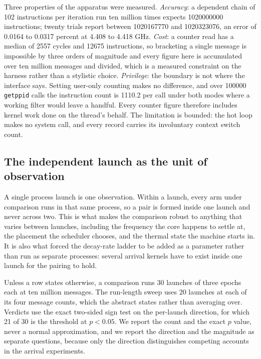 \documentclass[conference]{IEEEtran}
\begin{document}
Three properties of the apparatus were measured. \emph{Accuracy}: a dependent
chain of 102 instructions per iteration run ten million times expects
1020000000 instructions; twenty trials report between 1020167770 and
1020323076, an error of 0.0164 to 0.0317 percent at 4.408 to 4.418 GHz.
\emph{Cost}: a counter read has a median of 2557 cycles and 12675 instructions,
so bracketing a single message is impossible by three orders of magnitude and
every figure here is accumulated over ten million messages and divided, which
is a measured constraint on the harness rather than a stylistic choice.
\emph{Privilege}: the boundary is not where the interface says. Setting
user-only counting makes no difference, and over 100000 \texttt{getppid} calls
the instruction count is 1110.2 per call under both modes where a working
filter would leave a handful. Every counter figure therefore includes kernel
work done on the thread's behalf. The limitation is bounded: the hot loop makes
no system call, and every record carries its involuntary context switch count.

\subsection{The independent launch as the unit of observation}

A single process launch is one observation. Within a launch, every arm under
comparison runs in that same process, so a pair is formed inside one launch and
never across two. This is what makes the comparison robust to anything that
varies between launches, including the frequency the core happens to settle at,
the placement the scheduler chooses, and the thermal state the machine starts
in. It is also what forced the decay-rate ladder to be added as a parameter
rather than run as separate processes: several arrival kernels have to exist
inside one launch for the pairing to hold.

Unless a row states otherwise, a comparison runs 30 launches of three epochs
each at ten million messages. The run-length sweep uses 20 launches at each of
its four message counts, which the abstract states rather than averaging over.
Verdicts use the exact two-sided sign test on the per-launch direction, for
which 21 of 30 is the threshold at $p < 0.05$. We report the count and the exact
$p$ value, never a normal approximation, and we report the direction and the
magnitude as separate questions, because only the direction distinguishes
competing accounts in the arrival experiments.
\end{document}

